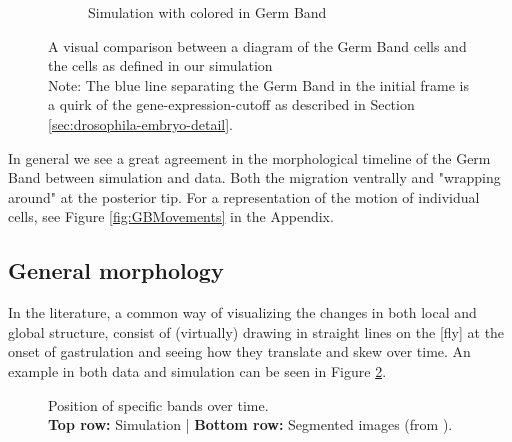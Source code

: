 \begin{figure}[H]
\begin{subfigure}[b]{0.61\textwidth}
    \caption{Simulation with colored in Germ Band}
    \end{subfigure}
    \caption{A visual comparison between a diagram of the Germ Band cells and the cells as defined in our simulation\\Note: The blue line separating the Germ Band in the initial frame is a quirk of the gene-expression-cutoff as described in Section \ref{sec:drosophila-embryo-detail}.}
    \label{fig:germbandCompare}
\end{figure}


In general we see a great agreement in the morphological timeline of the Germ Band between simulation and data. Both the migration ventrally and "wrapping around" at the posterior tip. For a representation of the motion of individual cells, see Figure \ref{fig:GBMovements} in the Appendix.


\subsection{General morphology}
In the literature, a common way of visualizing the changes in both local and global structure, consist of (virtually) drawing in straight lines on the [fly] at the onset of gastrulation and seeing how they translate and skew over time. An example in both data and simulation can be seen in Figure \ref{fig:band-movements-stas}.

\begin{figure}[H]
    \centering
\end{figure}
\begin{figure}[H]
    \centering
    \caption{Position of specific bands over time.\\ \textbf{Top row:} Simulation | \textbf{Bottom row:}  Segmented images (from \cite{stern2022deconstructing}). \\}
    \label{fig:band-movements-stas}
\end{figure}

